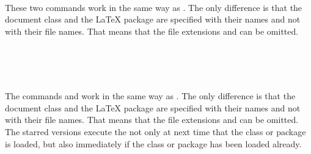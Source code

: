 \begin{Declaration}
  \\
\end{Declaration}%
%
%
These two commands work in the same way as .  The
only difference is that the document class  and the
{\LaTeX} package  are specified with their names and
not with their file names.  That means that the file extensions
 and  can be omitted.
%
%
%

\begin{Declaration}
  \\
  \\
  \\
\end{Declaration}%
%
%
%
%
The commands  and  work in the
same way as .  The only difference is that the
document class  and the {\LaTeX} package 
are specified with their names and not with their file names.  That
means that the file extensions  and  can be
omitted.  The starred versions execute the  not
only at next time that the class or package is loaded, but also
immediately if the class or package has been loaded already.
%
%
%
%
%

